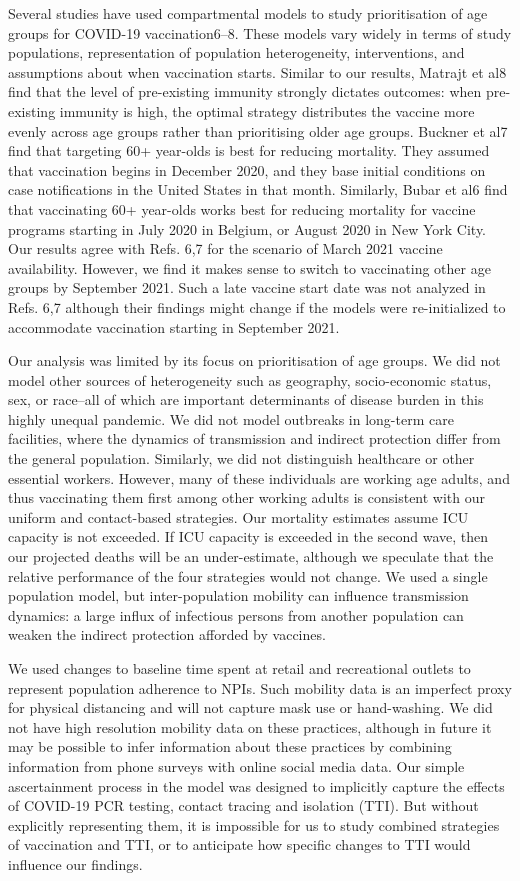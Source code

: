 Several studies have used compartmental models to study prioritisation of age groups for COVID-19 vaccination6–8. These models vary widely in terms of study populations, representation of population heterogeneity, interventions, and assumptions about when vaccination starts. Similar to our results, Matrajt et al8  find that the level of pre-existing immunity strongly dictates outcomes: when pre-existing immunity is high, the optimal strategy distributes the vaccine more evenly across age groups rather than prioritising older age groups. Buckner et al7 find that targeting 60+ year-olds is best for reducing mortality. They assumed that vaccination begins in December 2020, and they base initial conditions on case notifications in the United States in that month. Similarly, Bubar et al6 find that vaccinating 60+ year-olds works best for reducing mortality for vaccine programs starting in July 2020 in Belgium, or August 2020 in New York City. Our results agree with Refs. 6,7 for the scenario of March 2021 vaccine availability. However, we find it makes sense to switch to vaccinating other age groups by September 2021. Such a late vaccine start date was not analyzed in Refs. 6,7 although their findings might change if the models were re-initialized to accommodate vaccination starting in September 2021. 

Our analysis was limited by its focus on prioritisation of age groups.  We did not model other sources of heterogeneity such as geography, socio-economic status, sex, or race--all of which are important determinants of disease burden in this highly unequal pandemic. We did not model outbreaks in long-term care facilities, where the dynamics of transmission and indirect protection differ from the general population. Similarly, we did not distinguish healthcare or other essential workers. However, many of these individuals are working age adults, and thus vaccinating them first among other working adults is consistent with our uniform and contact-based strategies. Our mortality estimates assume ICU capacity is not exceeded. If ICU capacity is exceeded in the second wave, then our projected deaths will be an under-estimate, although we speculate that the relative performance of the four strategies would not change. We used a single population model, but inter-population mobility can influence transmission dynamics: a large influx of infectious persons from another population can weaken the indirect protection afforded by vaccines. 

We used changes to baseline time spent at retail and recreational outlets to represent population adherence to NPIs.  Such mobility data is an imperfect proxy for physical distancing and will not capture mask use or hand-washing.  We did not have high resolution mobility data on these practices, although in future it may be possible to infer information about these practices by combining information from phone surveys with online social media data. Our simple ascertainment process in the model was designed to implicitly capture the effects of COVID-19 PCR testing, contact tracing and isolation (TTI). But without explicitly representing them, it is impossible for us to study combined strategies of vaccination and TTI, or to anticipate how specific changes to TTI would influence our findings. 

